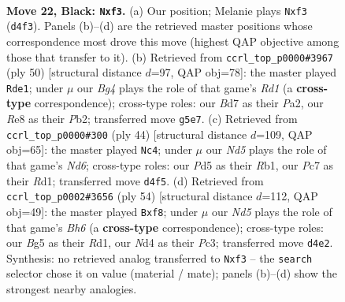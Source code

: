 \documentclass[11pt]{article}
\begin{document}
\clearpage

\begin{figure}[p]\centering
\begin{subfigure}{0.46\textwidth}\centering
\resizebox{\linewidth}{!}{%
\newchessgame
\chessboard[
  setfen={r3r3/1ppb1pkp/8/p2p2b1/3n2P1/NP2PQ2/P2B1P1q/RN2RK2 b - - 1 22},
  showmover=false,
  pgfstyle=straightmove, color=movearrow, markmove={d4-f3}
]}
\caption{}
\end{subfigure}\hfill
\begin{subfigure}{0.46\textwidth}\centering
\resizebox{\linewidth}{!}{%
\newchessgame
\chessboard[
  setfen={r2nnk1r/1p3p1p/p3b3/4qB2/3p3Q/2N5/PPP3PP/3R1R1K w - - 2 26},
  showmover=false,
  pgfstyle=straightmove, color=movearrow, markmove={d1-e1}
]}
\caption{}
\end{subfigure}
\\[4pt]
\begin{subfigure}{0.46\textwidth}\centering
\resizebox{\linewidth}{!}{%
\newchessgame
\chessboard[
  setfen={r5k1/p4pp1/2pNr1np/3bq3/P3p3/6P1/2Q1PPBP/1R1R2K1 w - - 4 23},
  showmover=false,
  pgfstyle=straightmove, color=movearrow, markmove={d6-c4}
]}
\caption{}
\end{subfigure}\hfill
\begin{subfigure}{0.46\textwidth}\centering
\resizebox{\linewidth}{!}{%
\newchessgame
\chessboard[
  setfen={2rq1nk1/p4r2/1p2pppB/1B1b4/P2p4/2P3Q1/5PP1/3RR1K1 w - - 4 28},
  showmover=false,
  pgfstyle=straightmove, color=movearrow, markmove={h6-f8}
]}
\caption{}
\end{subfigure}
\caption{\textbf{Move 22, Black: \texttt{Nxf3}.} (a) Our position; Melanie plays \texttt{Nxf3} (\texttt{d4f3}). Panels (b)--(d) are the retrieved master positions whose correspondence most drove this move (highest QAP objective among those that transfer to it). (b) Retrieved from \texttt{ccrl\_top\_p0000\#3967} (ply 50) [structural distance $d$=97, QAP obj=78]: the master played \texttt{Rde1}; under $\mu$ our \emph{Bg4} plays the role of that game's \emph{Rd1} (a \textbf{cross-type} correspondence); cross-type roles: our \emph{B}d7 as their \emph{P}a2, our \emph{R}e8 as their \emph{P}b2; transferred move \texttt{g5e7}. (c) Retrieved from \texttt{ccrl\_top\_p0000\#300} (ply 44) [structural distance $d$=109, QAP obj=65]: the master played \texttt{Nc4}; under $\mu$ our \emph{Nd5} plays the role of that game's \emph{Nd6}; cross-type roles: our \emph{P}d5 as their \emph{R}b1, our \emph{P}c7 as their \emph{R}d1; transferred move \texttt{d4f5}. (d) Retrieved from \texttt{ccrl\_top\_p0002\#3656} (ply 54) [structural distance $d$=112, QAP obj=49]: the master played \texttt{Bxf8}; under $\mu$ our \emph{Nd5} plays the role of that game's \emph{Bh6} (a \textbf{cross-type} correspondence); cross-type roles: our \emph{B}g5 as their \emph{R}d1, our \emph{N}d4 as their \emph{P}c3; transferred move \texttt{d4e2}. Synthesis: no retrieved analog transferred to \texttt{Nxf3} -- the \texttt{search} selector chose it on value (material / mate); panels (b)--(d) show the strongest nearby analogies.}
\label{fig:thought-m43}
\end{figure}
\end{document}
